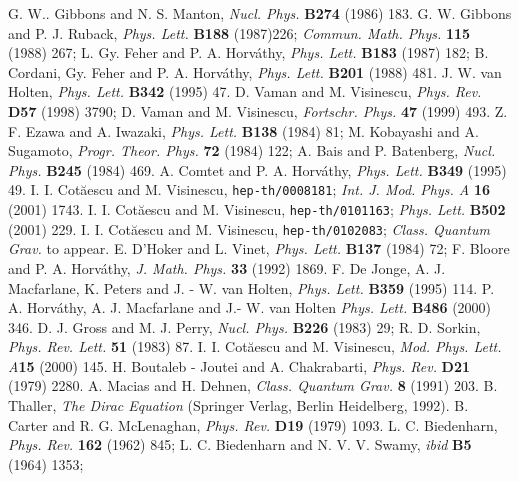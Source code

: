 \documentclass[a4paper,12pt]{article}
\begin{document}
\begin{thebibliography}{99}

G.  W..  Gibbons and N.  S.  Manton,
{\em Nucl.  Phys. } {\bf B274} (1986) 183. 
G.  W.  Gibbons and P.  J.  Ruback, 
{\em Phys.  Lett. } {\bf B188} (1987)226;
{\em Commun.  Math.  Phys. } {\bf 115} (1988) 267;
L.  Gy.  Feher and P.  A.  Horv\' athy, 
{\em Phys.  Lett. } {\bf B183} (1987) 182; 
B.  Cordani, Gy.  Feher and P.  A.  Horv\' athy,
{\em Phys.  Lett. } {\bf B201} (1988) 481. 
J.  W.  van Holten, {\em Phys.  Lett. } {\bf B342} (1995) 47. 
D.  Vaman and M.  Visinescu, 
{\em Phys.  Rev. } {\bf D57} (1998) 3790;
D.  Vaman and M.  Visinescu, 
{\em Fortschr.  Phys. } {\bf 47} (1999) 493. 
Z.  F.  Ezawa and A.  Iwazaki, {\em Phys.  Lett. } {\bf B138} (1984) 81; 
M.  Kobayashi and A.  Sugamoto, {\em Progr.  Theor.  Phys. } {\bf 72} (1984) 
122; A.  Bais and P.  Batenberg, {\em Nucl.  Phys. } {\bf B245} (1984) 469. 
A.  Comtet and P.  A.  Horv\' athy, {\em Phys.  Lett. } {\bf B349} (1995) 49. 
I.  I.  Cot\u aescu and M.  Visinescu,
{\tt hep-th/0008181}; {\em Int.  J.  Mod.  Phys.  A} {\bf 16} (2001) 1743. 
I.  I.  Cot\u aescu and M. Visinescu,
{\tt hep-th/0101163}; {\em Phys. Lett. } {\bf B502} (2001) 229. 
I.  I.  Cot\u aescu and M.  Visinescu,
{\tt hep-th/0102083}; {\em Class. Quantum Grav.} to appear.  
E.  D'Hoker and L.  Vinet, {\em Phys.  Lett. } {\bf B137} (1984) 72;
F.  Bloore and P.  A.  Horv\' athy, {\em J.  Math.  Phys. } {\bf 33} (1992) 
1869.   
F.  De Jonge, A.  J.  Macfarlane, K.  Peters and J. - W.  van Holten, 
{\em Phys.  Lett. }  {\bf B359} (1995) 114. 
P. A. Horv\' athy, A. J. Macfarlane and J.- W. van Holten
{\em Phys. Lett.} {\bf B486} (2000) 346.
D.  J.  Gross and M.  J.  Perry, {\em Nucl. Phys. } {\bf B226} (1983) 29;
R.  D.  Sorkin, {\em Phys. Rev. Lett. } {\bf 51} (1983) 87. 
I.  I.  Cot\u aescu and M.  Visinescu,
{\em Mod.  Phys.  Lett.  A}{\bf 15} (2000) 145. 
H.  Boutaleb - Joutei and A.  Chakrabarti, {\em Phys.  Rev. } {\bf D21} (1979)
2280. 
A.  Macias and H.  Dehnen, {\em Class.  Quantum Grav. } {\bf 8} (1991) 203. 
B.  Thaller,  {\it The Dirac Equation} (Springer Verlag, Berlin 
Heidelberg, 1992). 
B.  Carter and R.  G.  McLenaghan, {\em Phys.  Rev. } {\bf D19} (1979) 1093. 
L. C. Biedenharn, {\em Phys. Rev.} {\bf 162} (1962) 845;
L. C. Biedenharn and N. V. V. Swamy, {\em ibid}  {\bf B5} (1964) 1353;

\end{thebibliography}
\end{document}
